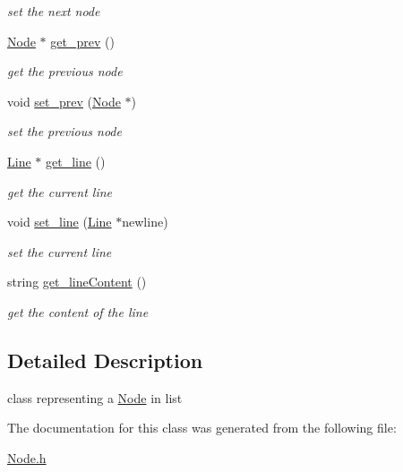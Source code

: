\begin{DoxyCompactItemize}
\begin{DoxyCompactList}\small\item\em set the next node \end{DoxyCompactList}\item 
\hypertarget{class_node_ae1f2f87a25c263e385f435059516d0df}{\hyperlink{class_node}{Node} $\ast$ \hyperlink{class_node_ae1f2f87a25c263e385f435059516d0df}{get\-\_\-prev} ()}\label{class_node_ae1f2f87a25c263e385f435059516d0df}

\begin{DoxyCompactList}\small\item\em get the previous node \end{DoxyCompactList}\item 
\hypertarget{class_node_ae956250c849d3886566229dc7264e797}{void \hyperlink{class_node_ae956250c849d3886566229dc7264e797}{set\-\_\-prev} (\hyperlink{class_node}{Node} $\ast$)}\label{class_node_ae956250c849d3886566229dc7264e797}

\begin{DoxyCompactList}\small\item\em set the previous node \end{DoxyCompactList}\item 
\hypertarget{class_node_a148767567f75e6d3e5e8f8ff9e438336}{\hyperlink{class_line}{Line} $\ast$ \hyperlink{class_node_a148767567f75e6d3e5e8f8ff9e438336}{get\-\_\-line} ()}\label{class_node_a148767567f75e6d3e5e8f8ff9e438336}

\begin{DoxyCompactList}\small\item\em get the current line \end{DoxyCompactList}\item 
\hypertarget{class_node_acb0fcb0970c2e2efd9ec90133ea8d236}{void \hyperlink{class_node_acb0fcb0970c2e2efd9ec90133ea8d236}{set\-\_\-line} (\hyperlink{class_line}{Line} $\ast$newline)}\label{class_node_acb0fcb0970c2e2efd9ec90133ea8d236}

\begin{DoxyCompactList}\small\item\em set the current line \end{DoxyCompactList}\item 
\hypertarget{class_node_a97c6b9e99919926b82b33444883754f1}{string \hyperlink{class_node_a97c6b9e99919926b82b33444883754f1}{get\-\_\-line\-Content} ()}\label{class_node_a97c6b9e99919926b82b33444883754f1}

\begin{DoxyCompactList}\small\item\em get the content of the line \end{DoxyCompactList}\end{DoxyCompactItemize}


\subsection{Detailed Description}
class representing a \hyperlink{class_node}{Node} in list 

The documentation for this class was generated from the following file\-:\begin{DoxyCompactItemize}
\item 
\hyperlink{_node_8h}{Node.\-h}\end{DoxyCompactItemize}

